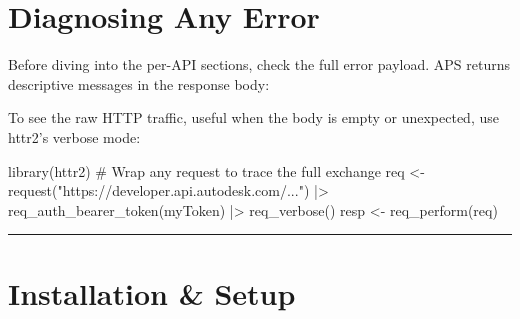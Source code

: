 \documentclass[
  11pt,
  letterpaper,
  DIV=11,
  numbers=noendperiod]{scrreprt}
\newenvironment{Shaded}{\begin{snugshade}}{\end{snugshade}}
\newcommand{\CommentTok}[1]{\textcolor[rgb]{0.37,0.37,0.37}{#1}}
\newcommand{\FunctionTok}[1]{\textcolor[rgb]{0.28,0.35,0.67}{#1}}
\newcommand{\NormalTok}[1]{\textcolor[rgb]{0.00,0.23,0.31}{#1}}
\newcommand{\OtherTok}[1]{\textcolor[rgb]{0.00,0.23,0.31}{#1}}
\newcommand{\SpecialCharTok}[1]{\textcolor[rgb]{0.37,0.37,0.37}{#1}}
\newcommand{\StringTok}[1]{\textcolor[rgb]{0.13,0.47,0.30}{#1}}
\begin{document}
\section{Diagnosing Any Error}\label{diagnosing-any-error}

Before diving into the per-API sections, check the full error payload.
APS returns descriptive messages in the response body:

\begin{Shaded}
\end{Shaded}

To see the raw HTTP traffic, useful when the body is empty or
unexpected, use httr2's verbose mode:

\begin{Shaded}
\begin{Highlighting}[]
\FunctionTok{library}\NormalTok{(httr2)}
\CommentTok{\# Wrap any request to trace the full exchange}
\NormalTok{req }\OtherTok{\textless{}{-}} \FunctionTok{request}\NormalTok{(}\StringTok{"https://developer.api.autodesk.com/..."}\NormalTok{) }\SpecialCharTok{|\textgreater{}}
  \FunctionTok{req\_auth\_bearer\_token}\NormalTok{(myToken) }\SpecialCharTok{|\textgreater{}}
  \FunctionTok{req\_verbose}\NormalTok{()}
\NormalTok{resp }\OtherTok{\textless{}{-}} \FunctionTok{req\_perform}\NormalTok{(req)}
\end{Highlighting}
\end{Shaded}

\begin{center}\rule{0.5\linewidth}{0.5pt}\end{center}

\section{Installation \& Setup}\label{installation-setup}
\end{document}
